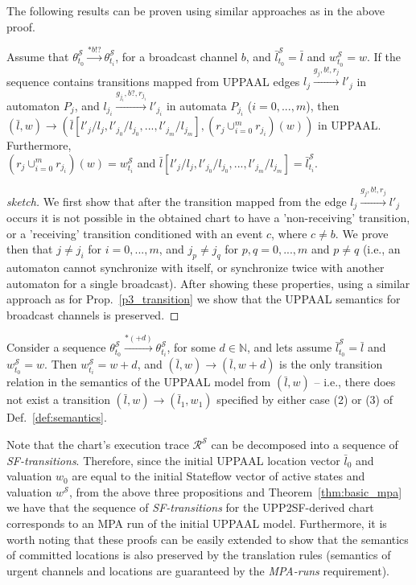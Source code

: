  
The following results can be proven using similar approaches as in the above proof. 

\begin{proposition}
\label{p4_broadtransition}
Assume that $\theta^\mathcal{S}_{t_0}\xrightarrow{*b!?}\theta^\mathcal{S}_{t_i}$, for a broadcast channel $b$, and $\bar{l}^\mathcal{S}_{t_0}=\bar{l}$ and $w^\mathcal{S}_{t_0}=w$. If  the sequence contains transitions mapped from UPPAAL edges  $l_{j} \xrightarrow{g_j,b!,r_j} l'_{j}$ in automaton $P_{j}$, and  $l_{j_i} \xrightarrow{g_{j_i},b?,r_{j_i}} l'_{j_i}$ in automata $P_{j_i}$ ($i=0,...,m$), then 
$(\bar{l},w)\rightarrow (\bar{l}[l'_j/l_j,l'_{j_0}/l_{j_0},...,l'_{j_m}/l_{j_m}],(r_j\cup_{i=0}^m r_{j_i})(w))$ in UPPAAL. Furthermore, \\$(r_j\cup_{i=0}^m r_{j_i})(w)=w^{\mathcal{S}}_{t_i}$ and $\bar{l}[l'_j/l_j,l'_{j_0}/l_{j_0},...,l'_{j_m}/l_{j_m}]=\bar{l}^\mathcal{S}_{t_i}$.
\end{proposition} 

\begin{proof}[sketch]
We first show that after the transition mapped from the edge $l_{j} \xrightarrow{g_j,b!,r_j} l'_{j}$ occurs it is not possible in the obtained chart to have a 'non-receiving' transition, or a 'receiving' transition conditioned with an event $c$, where $c\neq b$. We prove then that $j\neq j_i$ for $i=0,...,m$, and $j_p\neq j_q$ for $p,q=0,...,m$ and $p\neq q$ (i.e., an automaton cannot synchronize with itself, or synchronize twice with another automaton for a single broadcast). After showing these properties, using a similar approach as for Prop.~\ref{p3_transition} we show that the UPPAAL semantics for broadcast channels is preserved. 
\end{proof}


\begin{proposition}
\label{p5_notransition}
Consider a sequence $\theta^\mathcal{S}_{t_0}\xrightarrow{*(+d)}\theta^\mathcal{S}_{t_i}$, for some $d\in\mathbb{N}$, and lets assume $\bar{l}^\mathcal{S}_{t_0}=\bar{l}$ and $w^\mathcal{S}_{t_0}=w$. Then $w^\mathcal{S}_{t_i}=w+d$, and $(\bar{l},w)\rightarrow (\bar{l},w+d)$ is the only transition relation in the semantics of the UPPAAL model from $(\bar{l},w)$ -- i.e., there does not exist a transition $(\bar{l},w)\rightarrow (\bar{l}_1,w_1)$ specified by either case (2) or (3) of Def.~\ref{def:semantics}.
\end{proposition} 


Note that the chart's execution trace $\mathcal{R}^\mathcal{S}$ can be decomposed into a sequence of \textit{SF-transitions}. 
Therefore, since the initial UPPAAL location vector $\bar{l}_0$ and valuation $w_0$ are equal to the initial Stateflow vector of active states and valuation $w^{\mathcal{S}}$, from the above three propositions and Theorem~\ref{thm:basic_mpa} we have that the sequence of \textit{SF-transitions} for the UPP2SF-derived chart corresponds to an MPA run of the initial UPPAAL model. Furthermore, it is worth noting that these proofs can be easily extended to show that the semantics of committed locations is also preserved by the translation rules (semantics of urgent channels and locations are guaranteed by the \textit{MPA-runs} requirement). 


